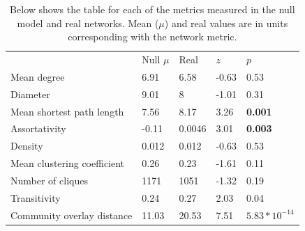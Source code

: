 \documentclass[twoside,twocolumn]{article}
\begin{document}
\begin{table}[]
\centering
\caption{Below shows the table for each of the metrics measured in the null model and real networks. Mean ($\mu$) and real values are in units corresponding with the network metric. }
\label{table2}
\begin{tabular}{lllll}
                                                 & Null $\mu$                     & Real                        & $z$                          & $p$                                      \\ \cline{2-5} 
\multicolumn{1}{l|}{Mean degree}                 & \multicolumn{1}{l|}{6.91}  & \multicolumn{1}{l|}{6.58}   & \multicolumn{1}{l|}{-0.63} & \multicolumn{1}{l|}{0.53}              \\ \cline{2-5} 
\multicolumn{1}{l|}{Diameter}                    & \multicolumn{1}{l|}{9.01}  & \multicolumn{1}{l|}{8}      & \multicolumn{1}{l|}{-1.01} & \multicolumn{1}{l|}{0.31}              \\ \cline{2-5} 
\multicolumn{1}{l|}{Mean shortest path length}   & \multicolumn{1}{l|}{7.56}  & \multicolumn{1}{l|}{8.17}   & \multicolumn{1}{l|}{3.26}  & \multicolumn{1}{l|}{\textbf{0.001}}    \\ \cline{2-5} 
\multicolumn{1}{l|}{Assortativity}               & \multicolumn{1}{l|}{-0.11} & \multicolumn{1}{l|}{0.0046} & \multicolumn{1}{l|}{3.01}  & \multicolumn{1}{l|}{\textbf{0.003}}    \\ \cline{2-5} 
\multicolumn{1}{l|}{Density}                     & \multicolumn{1}{l|}{0.012} & \multicolumn{1}{l|}{0.012}  & \multicolumn{1}{l|}{-0.63} & \multicolumn{1}{l|}{0.53}              \\ \cline{2-5} 
\multicolumn{1}{l|}{Mean clustering coefficient} & \multicolumn{1}{l|}{0.26}  & \multicolumn{1}{l|}{0.23}   & \multicolumn{1}{l|}{-1.61} & \multicolumn{1}{l|}{0.11}              \\ \cline{2-5} 
\multicolumn{1}{l|}{Number of cliques}           & \multicolumn{1}{l|}{1171}  & \multicolumn{1}{l|}{1051}   & \multicolumn{1}{l|}{-1.32} & \multicolumn{1}{l|}{0.19}              \\ \cline{2-5} 
\multicolumn{1}{l|}{Transitivity}                & \multicolumn{1}{l|}{0.24}  & \multicolumn{1}{l|}{0.27}   & \multicolumn{1}{l|}{2.03}  & \multicolumn{1}{l|}{0.04}              \\ \cline{2-5} 
\multicolumn{1}{l|}{Community overlay distance}  & \multicolumn{1}{l|}{11.03} & \multicolumn{1}{l|}{20.53}  & \multicolumn{1}{l|}{7.51}  & \multicolumn{1}{l|}{\textbf{$5.83*10^{-14}$}} \\ \cline{2-5} 
\end{tabular}
\end{table}
\end{document}
